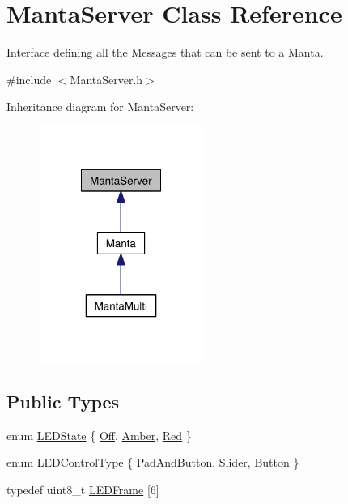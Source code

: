 \hypertarget{classMantaServer}{\section{\-Manta\-Server \-Class \-Reference}
\label{classMantaServer}
}


\-Interface defining all the \-Messages that can be sent to a \hyperlink{classManta}{\-Manta}.  




{\ttfamily \#include $<$\-Manta\-Server.\-h$>$}



\-Inheritance diagram for \-Manta\-Server\-:
\nopagebreak
\begin{figure}[H]
\begin{center}
\leavevmode
\includegraphics[width=152pt]{classMantaServer__inherit__graph}
\end{center}
\end{figure}
\subsection*{\-Public \-Types}
\begin{DoxyCompactItemize}
\item 
enum \hyperlink{classMantaServer_aefb7bb68319a53280ef9e9f84147288d}{\-L\-E\-D\-State} \{ \hyperlink{classMantaServer_aefb7bb68319a53280ef9e9f84147288da8a4b0be3cf43d33ac398855cb9938738}{\-Off}, 
\hyperlink{classMantaServer_aefb7bb68319a53280ef9e9f84147288da2a786ff004fc9b7ab92f93655bcba70f}{\-Amber}, 
\hyperlink{classMantaServer_aefb7bb68319a53280ef9e9f84147288daa59fd3455577ea618dd10aece086d2f4}{\-Red}
 \}
\item 
enum \hyperlink{classMantaServer_a4f86e1f91a11c2e3f40765a8166ac1cd}{\-L\-E\-D\-Control\-Type} \{ \hyperlink{classMantaServer_a4f86e1f91a11c2e3f40765a8166ac1cda5abecbdbb97befa40117e9700d269762}{\-Pad\-And\-Button}, 
\hyperlink{classMantaServer_a4f86e1f91a11c2e3f40765a8166ac1cdaff76cf85b95f9f4979cf5778a3bc423b}{\-Slider}, 
\hyperlink{classMantaServer_a4f86e1f91a11c2e3f40765a8166ac1cda22707822d22e50f84d81179dce34ec0f}{\-Button}
 \}
\item 
typedef uint8\-\_\-t \hyperlink{classMantaServer_a2ccc3326a971007da61a979a28c4ca98}{\-L\-E\-D\-Frame} \mbox{[}6\mbox{]}
\end{DoxyCompactItemize}
